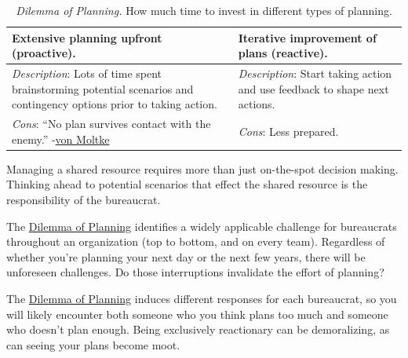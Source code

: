 \begin{center}
\begin{table}[H] %
\begin{tabular}{ | m{\dilemmatablewidth}| m{\dilemmatablewidth} | } 
  \hline
  \textbf{Extensive planning upfront (proactive).} & 
  \textbf{Iterative improvement of plans (reactive).} \\ 
  \hline
  \textit{Description}: Lots of time spent brainstorming potential scenarios and contingency options prior to taking action. & 
  \textit{Description}: Start taking action and use feedback to shape next actions. \\ 
  \hline
  \textit{Cons}: ``No plan survives contact with the enemy.'' {\small -\href{https://en.wikipedia.org/wiki/Helmuth_von_Moltke_the_Elder}{von Moltke}
  \index{Wikipedia!\href{https://en.wikipedia.org/wiki/Helmuth_von_Moltke_the_Elder}{Helmuth von Moltke}}
  } & 
  \textit{Cons}: Less prepared. \\  
  \hline
\end{tabular}
\caption{
\textit{Dilemma of Planning.}
How much time to invest in different types of planning.
}
\label{table:planning}
\end{table}
\end{center}

Managing a shared resource requires more than just on-the-spot decision making. Thinking ahead to potential scenarios that effect the shared resource is the responsibility of the bureaucrat. 

The \hyperref[table:planning]{Dilemma of Planning} identifies a widely applicable challenge for bureaucrats throughout an organization (top to bottom, and on every team). Regardless of whether you're planning your next day or the next few years, there will be unforeseen challenges. Do those interruptions invalidate the effort of planning?

The \hyperref[table:planning]{Dilemma of Planning} induces different responses for each bureaucrat, so you will likely encounter both someone who you think plans too much and someone who doesn't plan enough. Being exclusively reactionary can be demoralizing, as can seeing your plans become moot.


